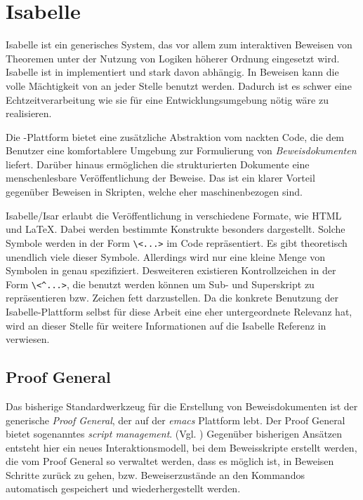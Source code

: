\section{Isabelle}

Isabelle ist ein generisches System, das vor allem zum interaktiven Beweisen von Theoremen unter
der Nutzung von Logiken höherer Ordnung eingesetzt wird. Isabelle ist in  implementiert und
stark davon abhängig. In Beweisen kann die volle Mächtigkeit von  an jeder Stelle benutzt
werden. Dadurch ist es schwer eine Echtzeitverarbeitung wie sie für eine Entwicklungsumgebung nötig
wäre zu realisieren.

Die -Plattform bietet eine zusätzliche Abstraktion vom nackten  Code, die dem
Benutzer eine komfortablere Umgebung zur Formulierung von \textit{Beweisdokumenten} liefert. Darüber
hinaus ermöglichen die strukturierten Dokumente eine menschenlesbare Veröffentlichung der Beweise.
Das ist ein klarer Vorteil gegenüber Beweisen in  Skripten, welche eher maschinenbezogen
sind.

Isabelle/Isar erlaubt die Veröffentlichung in verschiedene Formate, wie HTML und LaTeX. Dabei werden
bestimmte Konstrukte besonders dargestellt. Solche Symbole werden in der Form
\texttt{\textbackslash\textless ...\textgreater} im Code repräsentiert. Es gibt theoretisch
unendlich viele dieser Symbole. Allerdings wird nur eine kleine Menge von Symbolen in
\cite{isabelle} genau spezifiziert. Desweiteren existieren Kontrollzeichen in der Form
\texttt{\textbackslash\textless\textasciicircum ...\textgreater}, die benutzt werden können um
Sub- und Superskript zu repräsentieren bzw. Zeichen fett darzustellen. Da die konkrete Benutzung der
Isabelle-Plattform selbst für diese Arbeit eine eher untergeordnete Relevanz hat, wird an dieser
Stelle für weitere Informationen auf die Isabelle Referenz in \cite{isabelle} verwiesen.

\subsection{Proof General}

Das bisherige Standardwerkzeug für die Erstellung von Beweisdokumenten ist der generische
\textit{Proof General}, der auf der \textit{emacs} Plattform lebt. Der Proof General bietet
sogenanntes \textit{script management}. (Vgl. \cite{sm}) Gegenüber bisherigen Ansätzen entsteht hier
ein neues Interaktionsmodell, bei dem Beweisskripte erstellt werden, die vom Proof General so
verwaltet werden, dass es möglich ist, in Beweisen Schritte zurück zu gehen, bzw. Beweiserzustände
an den Kommandos automatisch gespeichert und wiederhergestellt werden. 

